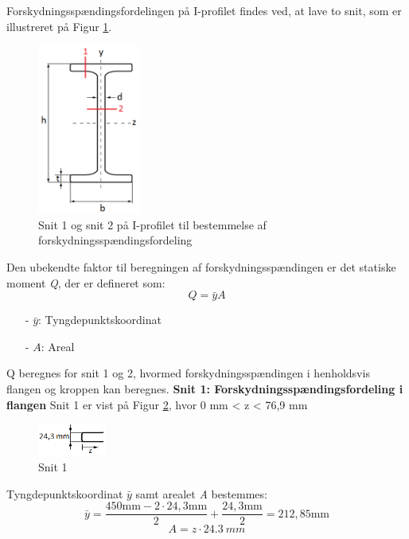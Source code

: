 Forskydningsspændingsfordelingen på I-profilet findes ved, at lave to snit, som er illustreret på Figur \ref{fig:snitsnit}. 

\begin{figure}[H]
	\centering
	\includegraphics[width=0.3\textwidth]{billeder/forskydningprofil.png}
	\caption{Snit 1 og snit 2 på I-profilet til bestemmelse af forskydningsspændingsfordeling}
	\label{fig:snitsnit}
\end{figure}

Den ubekendte faktor til beregningen af forskydningsspændingen er det statiske moment \textit{Q}, der er defineret som:
\begin{equation}
Q = \bar{y}A
\end{equation}
\begin{itemize}
	\item[-] $\bar{y}$: Tyngdepunktskoordinat
	\item[-] $A$: Areal
\end{itemize}

Q beregnes for snit 1 og 2, hvormed forskydningsspændingen i henholdsvis flangen og kroppen kan beregnes. 
\newline
\newline
\textbf{Snit 1: Forskydningsspændingsfordeling i flangen}
\newline
Snit 1 er vist på Figur \ref{fig:snitetforskyd}, hvor 0 mm < z < 76,9 mm

\begin{figure}[H]
	\centering
	\includegraphics[width=0.2\textwidth]{billeder/snitetforskydning.png}
	\caption{Snit 1}
	\label{fig:snitetforskyd}
\end{figure}

Tyngdepunktskoordinat $\bar{y}$ samt arealet \textit{A} bestemmes:
\begin{equation}
\bar{y} = \frac{450 \text{mm} - 2 \cdot 24,\!3 \text{mm}}{2} + \frac{24,\!3 \text{mm}}{2} = 212,\!85 \text{mm}
\end{equation}
\begin{equation}
A = z \cdot \SI{24,3}{mm}
\end{equation}

